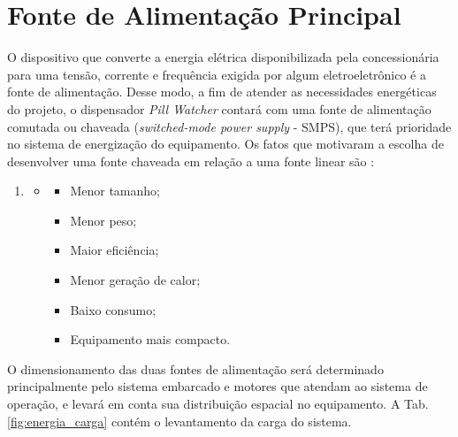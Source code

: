 \section{Fonte de Alimentação Principal} \label{section:energia_fonte}

 
 O dispositivo que converte a energia elétrica disponibilizada pela concessionária para uma tensão, corrente e frequência exigida por algum eletroeletrônico é a fonte de alimentação. Desse modo, a fim de atender as necessidades energéticas do projeto, o dispensador \textit{Pill Watcher} contará com uma fonte de alimentação comutada ou chaveada (\textit{switched-mode power supply} - SMPS), que terá prioridade no sistema de energização do equipamento. Os fatos que motivaram a escolha de desenvolver uma fonte chaveada em relação a uma fonte linear são \cite{Projeto_fonte}:
 
 \begin{enumerate}
    \item[ ]
    \begin{itemize}
        \item[ ]
        \begin{itemize}
            \item Menor tamanho;
            \item Menor peso;
            \item Maior eficiência;
            \item Menor geração de calor;
            \item Baixo consumo;
            \item Equipamento mais compacto.
        \end{itemize}
    \end{itemize}
\end{enumerate}

O dimensionamento das duas fontes de alimentação será determinado principalmente pelo sistema embarcado e motores que atendam ao sistema de operação, e levará em conta sua distribuição espacial no equipamento. A Tab. \ref{fig:energia_carga} contém o levantamento da carga do sistema.

 
